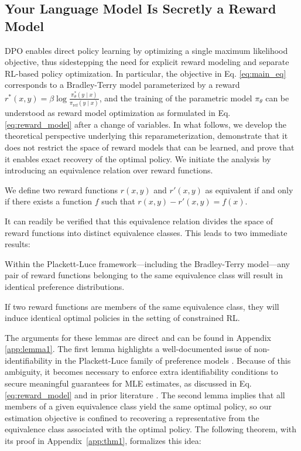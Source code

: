 \label{sec:theory}

\subsection{Your Language Model Is Secretly a Reward Model} 
DPO enables direct policy learning by optimizing a single maximum likelihood objective, thus sidestepping the need for explicit reward modeling and separate RL-based policy optimization. In particular, the objective in Eq. \ref{eq:main_eq} corresponds to a Bradley-Terry model parameterized by a reward $r^*(x, y) = \beta \log\frac{\pi^*_\theta(y \mid x)}{\pi_\text{ref}(y \mid x)}$, and the training of the parametric model $\pi_\theta$ can be understood as reward model optimization as formulated in Eq. \ref{eq:reward_model} after a change of variables. In what follows, we develop the theoretical perspective underlying this reparameterization, demonstrate that it does not restrict the space of reward models that can be learned, and prove that it enables exact recovery of the optimal policy. We initiate the analysis by introducing an equivalence relation over reward functions.

\begin{definition}
We define two reward functions $r(x, y)$ and $r'(x, y)$ as equivalent if and only if there exists a function $f$ such that ${r(x, y)-r'(x, y) = f(x)}$.
\end{definition}

It can readily be verified that this equivalence relation divides the space of reward functions into distinct equivalence classes. This leads to two immediate results:

\begin{lemma}\label{lemma:same_prefrence}
Within the Plackett-Luce framework—including the Bradley-Terry model—any pair of reward functions belonging to the same equivalence class will result in identical preference distributions.
\end{lemma}

\begin{lemma}\label{lemma:same_policy}
    If two reward functions are members of the same equivalence class, they will induce identical optimal policies in the setting of constrained RL.
\end{lemma}

The arguments for these lemmas are direct and can be found in Appendix \ref{app:lemma1}. The first lemma highlights a well-documented issue of non-identifiability in the Plackett-Luce family of preference models \cite{plackett1975analysis}. Because of this ambiguity, it becomes necessary to enforce extra identifiability conditions to secure meaningful guarantees for MLE estimates, as discussed in Eq. \ref{eq:reward_model} and in prior literature \cite{bong2022generalized}. The second lemma implies that all members of a given equivalence class yield the same optimal policy, so our estimation objective is confined to recovering a representative from the equivalence class associated with the optimal policy. The following theorem, with its proof in Appendix~\ref{app:thm1}, formalizes this idea:

